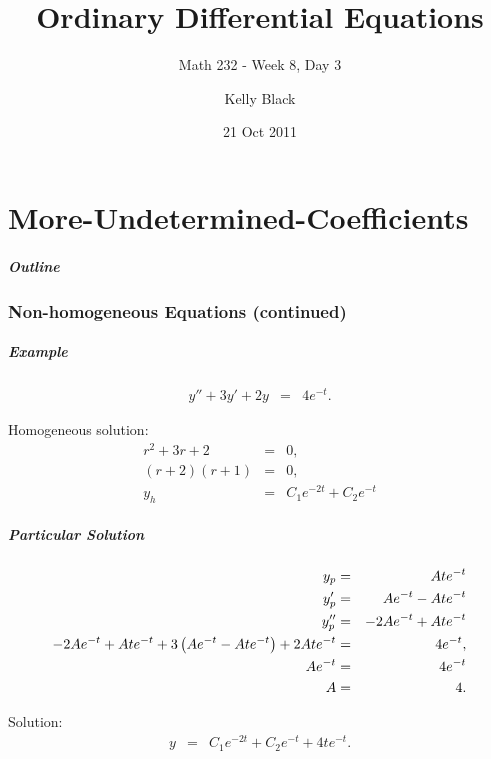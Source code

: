 \part{More-Undetermined-Coefficients}


\title{Ordinary Differential Equations}
\subtitle{Math 232 - Week 8, Day 3}

\author{Kelly Black}
\date{21 Oct 2011}

\begin{frame}
  \titlepage
\end{frame}

\begin{frame}
  \frametitle{Outline}
\end{frame}


\section{Non-homogeneous Equations (continued)}


\begin{frame}
  \frametitle{Example}

  \begin{eqnarray*}
    y'' + 3y' + 2y & = & 4 e^{-t}.
  \end{eqnarray*}

  {
    Homogeneous solution:
    \begin{eqnarray*}
      r^2 + 3r + 2 & = & 0, \\
      (r+2)(r+1) & = & 0, \\
      y_h & = & C_1 e^{-2t} + C_2 e^{-t}
    \end{eqnarray*}
  }

\end{frame}

\begin{frame}
  \frametitle{Particular Solution}

  \begin{eqnarray*}
    y_p & = & A t e^{-t} \\
    y_p' & = & A e^{-t} - Ate^{-t} \\
    y_p'' & = & -2A e^{-t} + At e^{-t} \\
    -2A e^{-t} + At e^{-t} + 3 \left( A e^{-t} - Ate^{-t} \right) 
    + 2 A t e^{-t} & = & 4 e^{-t}, \\
    A e^{-t} & = & 4 e^{-t} \\
    A & = & 4.
  \end{eqnarray*}

  Solution:
  \begin{eqnarray*}
    y & = & C_1 e^{-2t} + C_2 e^{-t} + 4 t e^{-t}.
  \end{eqnarray*}

\end{frame}


